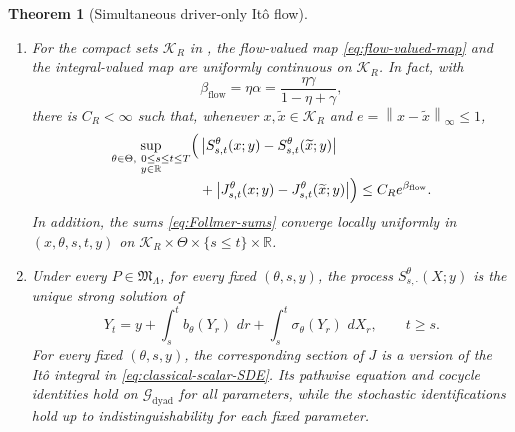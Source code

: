 \documentclass[10pt,a4paper]{amsart}
\newtheorem{theorem}{Theorem}
\newcommand{\R}{\mathbb R}
\newcommand{\abs}[1]{\left\lvert #1\right\rvert}
\newcommand{\cG}{\mathcal G}
\newcommand{\cK}{\mathcal K}
\newcommand{\dd}{\,d}
\newcommand{\norm}[1]{\left\lVert #1\right\rVert}
\begin{document}
\begin{theorem}[Simultaneous driver-only It\^o flow]
\begin{enumerate}[label=(\roman*),leftmargin=2.2em]
  \item For the compact sets \(\cK_R\) in
  , the flow-valued map
  \eqref{eq:flow-valued-map} and the integral-valued map are uniformly
  continuous on \(\cK_R\).  In fact, with
  \begin{equation}\label{eq:flow-holder-exponent}
    \beta_{\mathrm{flow}}
    =\eta\alpha
    =\frac{\eta\gamma}{1-\eta+\gamma},
  \end{equation}
  there is \(C_R<\infty\) such that, whenever
  \(x,\widetilde x\in\cK_R\) and
  \(e=\norm{x-\widetilde x}_\infty\le1\),
  \begin{align}
    \sup_{\substack{\theta\in\Theta,\ 0\le s\le t\le T\\y\in\R}}
    \Bigl(&
      \abs{S_{s,t}^\theta(x;y)-S_{s,t}^\theta(\widetilde x;y)}
      \notag\\[-0.2em]
      &+
      \abs{J_{s,t}^\theta(x;y)-J_{s,t}^\theta(\widetilde x;y)}
    \Bigr)
    \le C_Re^{\beta_{\mathrm{flow}}}.
    \label{eq:flow-raw-holder}
  \end{align}
  In addition, the sums \eqref{eq:Follmer-sums} converge locally uniformly in
  \((x,\theta,s,t,y)\) on
  \(\cK_R\times\Theta\times\{s\le t\}\times\R\).

  \item Under every \(P\in\mathfrak M_\Lambda\), for every fixed
  \((\theta,s,y)\), the process
  \(S_{s,\cdot}^\theta(X;y)\) is the unique strong solution of
  \begin{equation}\label{eq:classical-scalar-SDE}
    Y_t
    =y+\int_s^t b_\theta(Y_r)\,\dd r
       +\int_s^t\sigma_\theta(Y_r)\,\dd X_r,
    \qquad t\ge s.
  \end{equation}
  For every fixed \((\theta,s,y)\), the corresponding section of \(J\) is a
  version of the It\^o integral in \eqref{eq:classical-scalar-SDE}.  Its
  pathwise equation and cocycle identities hold on
  \(\cG_{\mathrm{dyad}}\) for all parameters, while the stochastic
  identifications hold up to indistinguishability for each fixed parameter.
\end{enumerate}
\end{theorem}
\end{document}

